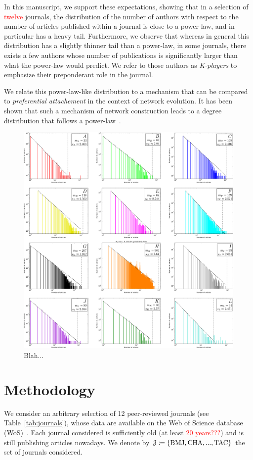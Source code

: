 \documentclass[aps,prl,floatfix,twocolumn]{revtex4-1}
\begin{document}
In this manuscript, we support these expectations, showing that in a selection of \textcolor{red}{twelve} journals, the distribution of the number of authors with respect to the number of articles published within a journal is close to a power-law, and in particular has a heavy tail. 
Furthermore, we observe that whereas in general this distribution has a slightly thinner tail than a power-law, in some journals, there exists a few authors whose number of publications is significantly larger than what the power-law would predict. 
We refer to those authors as \emph{K-players} to emphasize their preponderant role in the journal. 

We relate this power-law-like distribution to a mechanism that can be compared to \emph{preferential attachement} in the context of network evolution. 
It has been shown that such a mechanism of network construction leads to a degree distribution that follows a power-law~\cite{Kra00}.

\begin{figure}
 \centering
 \includegraphics[width=\textwidth]{figures/ABCDEFGHIJKL.pdf}
 \caption{Blah...}
 \label{fig:1}
\end{figure}

\section{Methodology}
We consider an arbitrary selection of 12 peer-reviewed journals (see Table~\ref{tab:journals}), whose data are available on the Web of Science database (WoS)~\cite{WoS}. 
Each journal considered is sufficiently old (at least \textcolor{red}{20 years???}) and is still publishing articles nowadays. 
We denote by ${\cal J}\coloneqq\{{\rm BMJ},{\rm CHA},...,{\rm TAC}\}$ the set of journals considered.
\end{document}
